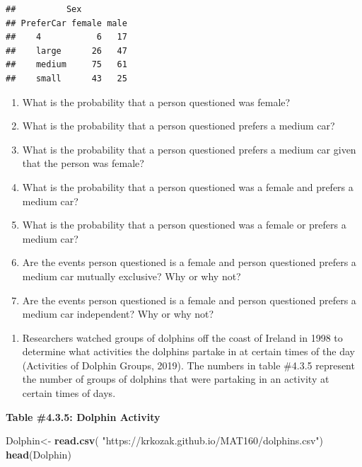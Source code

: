 \documentclass[
]{book}
\newenvironment{Shaded}{\begin{snugshade}}{\end{snugshade}}
\newcommand{\KeywordTok}[1]{\textcolor[rgb]{0.13,0.29,0.53}{\textbf{#1}}}
\newcommand{\NormalTok}[1]{#1}
\newcommand{\StringTok}[1]{\textcolor[rgb]{0.31,0.60,0.02}{#1}}
\providecommand{\tightlist}{%
  \setlength{\itemsep}{0pt}\setlength{\parskip}{0pt}}
\begin{document}
\begin{verbatim}
##          Sex
## PreferCar female male
##    4           6   17
##    large      26   47
##    medium     75   61
##    small      43   25
\end{verbatim}

\begin{enumerate}
\def\labelenumi{\alph{enumi}.}
\tightlist
\item
  What is the probability that a person questioned was female?
\item
  What is the probability that a person questioned prefers a medium car?
\item
  What is the probability that a person questioned prefers a medium car given that the person was female?
\item
  What is the probability that a person questioned was a female and prefers a medium car?
\item
  What is the probability that a person questioned was a female or prefers a medium car?
\item
  Are the events person questioned is a female and person questioned prefers a medium car mutually exclusive? Why or why not?
\item
  Are the events person questioned is a female and person questioned prefers a medium car independent? Why or why not?
\end{enumerate}

\begin{enumerate}
\def\labelenumi{\arabic{enumi}.}
\setcounter{enumi}{11}
\tightlist
\item
  Researchers watched groups of dolphins off the coast of Ireland in 1998 to determine what activities the dolphins partake in at certain times of the day (Activities of Dolphin Groups, 2019). The numbers in
  table \#4.3.5 represent the number of groups of dolphins that were partaking in an activity at certain times of days.
\end{enumerate}

\textbf{Table \#4.3.5: Dolphin Activity}

\begin{Shaded}
\begin{Highlighting}[]
\NormalTok{Dolphin<-}\StringTok{ }\KeywordTok{read.csv}\NormalTok{(}
  \StringTok{"https://krkozak.github.io/MAT160/dolphins.csv"}\NormalTok{) }
\KeywordTok{head}\NormalTok{(Dolphin)}
\end{Highlighting}
\end{Shaded}
\end{document}
